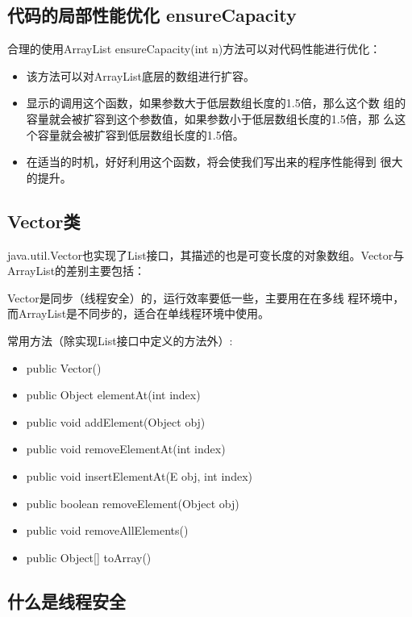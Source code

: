 \subsection{代码的局部性能优化 ensureCapacity}

合理的使用ArrayList ensureCapacity(int n)方法可以对代码性能进行优化：

\begin{itemize}
\item 该方法可以对ArrayList底层的数组进行扩容。
\item 显示的调用这个函数，如果参数大于低层数组长度的1.5倍，那么这个数
  组的容量就会被扩容到这个参数值，如果参数小于低层数组长度的1.5倍，那
  么这个容量就会被扩容到低层数组长度的1.5倍。
\item 在适当的时机，好好利用这个函数，将会使我们写出来的程序性能得到
  很大的提升。
\end{itemize}



\subsection{Vector类}

java.util.Vector也实现了List接口，其描述的也是可变长度的对象数组。Vector与ArrayList的差别主要包括：

{\Red\kai Vector是同步（线程安全）的，运行效率要低一些，主要用在在多线
  程环境中，而ArrayList是不同步的，适合在单线程环境中使用。}

常用方法（除实现List接口中定义的方法外）:

\begin{itemize}\small
\item public Vector()
\item public Object elementAt(int index)
\item public void addElement(Object obj)
\item public void removeElementAt(int index)
\item public void insertElementAt(E obj, int index) 
\item public boolean removeElement(Object obj) 
\item public void removeAllElements()
\item public Object[] toArray()
\end{itemize}


\subsection{什么是线程安全}

